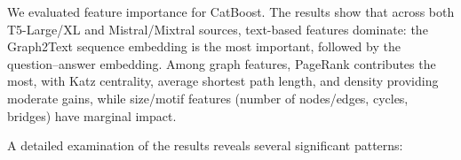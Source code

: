 


We evaluated feature importance for CatBoost. The results show that across both T5-Large/XL and Mistral/Mixtral sources, text-based features dominate: the Graph2Text sequence embedding is the most important, followed by the question–answer embedding. Among graph features, PageRank contributes the most, with Katz centrality, average shortest path length, and density providing moderate gains, while size/motif features (number of nodes/edges, cycles, bridges) have marginal impact.

A detailed examination of the results reveals several significant patterns:

